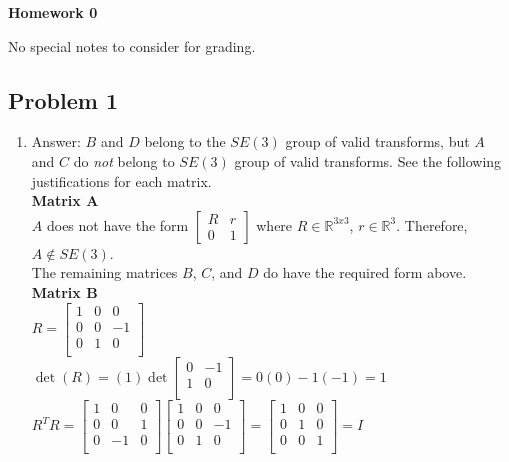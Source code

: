 \documentclass[12pt,letterpaper]{article}
\newcommand\R{\mathbb R}
\begin{document}
  \thispagestyle{firstpagestyle}
  \begin{center}
    {\huge \textbf{Homework 0}}
  \end{center}


    No special notes to consider for grading.
    
    

\subsection*{Problem 1}

\begin{enumerate}[leftmargin=*]
\item Answer: $B$ and $D$ belong to the $SE(3)$ group of valid transforms, but $A$ and $C$ do \textit{not} belong to $SE(3)$ group of valid transforms. See the following justifications for each matrix.\\

\textbf{Matrix A}\\
$A$ does not have the form $\begin{bmatrix} R & r \\ 0 & 1 \end{bmatrix}$ where $R \in {\R}^{3x3}$, $r \in {\R}^3$. Therefore, $A \notin SE(3)$.\\

The remaining matrices $B$, $C$, and $D$ do have the required form above.\\

\textbf{Matrix B}\\

$R = \begin{bmatrix} 1 & 0 & 0\\ 0 & 0 & -1\\ 0 & 1 & 0\\ \end{bmatrix}$\\

$\det(R) = (1) \det \begin{bmatrix} 0 & -1\\ 1 & 0\\ \end{bmatrix} = 0(0)-1(-1) = 1$\\

$R^{T} R = 
\begin{bmatrix} 1 & 0 & 0\\ 0 & 0 & 1\\ 0 & -1 & 0\\ \end{bmatrix} 
\begin{bmatrix} 1 & 0 & 0\\ 0 & 0 & -1\\ 0 & 1 & 0\\ \end{bmatrix}  
= \begin{bmatrix} 1 & 0 & 0\\ 0 & 1 & 0\\ 0 & 0 & 1\\ \end{bmatrix} 
= I$\\


\end{enumerate}
\end{document}
